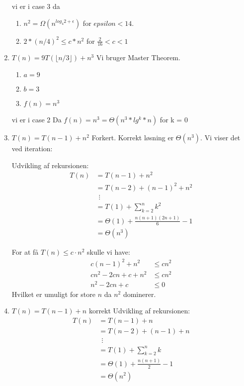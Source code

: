 \documentclass{article}
\theoremstyle{definition}
\begin{document}
\begin{enumerate}
    vi er i case 3 da
    \begin{enumerate}
        \item $n^2 = \Omega(n^{log_4 2+\epsilon})$ for $epsilon < 14$.
        \item $2*(n/4)^2 \leq c*n^2$ for $\frac{2}{16} < c < 1$
    \end{enumerate}


    \item $T(n) = 9T(\lfloor n/3 \rfloor) + n^3$
    Vi bruger Master Theorem.
    \begin{enumerate}
        \item $a=9$
        \item $b=3$
        \item $f(n) = n^3$
    \end{enumerate}
    vi er i case 2 Da
    $f(n)=n^3=\Theta(n^3 * lg^{k}*n)$ for k = 0

    \item $T(n) = T(n-1) + n^2$
    Forkert. Korrekt løsning er $\Theta(n^3)$. 
    Vi viser det ved iteration:
    
    Udvikling af rekursionen:
    \begin{align*}
    T(n) &= T(n-1) + n^2 \\
         &= T(n-2) + (n-1)^2 + n^2 \\
         &\ \ \vdots \\
         &= T(1) + \sum_{k=2}^n k^2 \\
         &= \Theta(1) + \frac{n(n+1)(2n+1)}{6} - 1 \\
         &= \Theta(n^3)
    \end{align*}
    
    For at få $T(n) \leq c\cdot n^2$ skulle vi have:
    \begin{align*}
    c(n-1)^2 + n^2 &\leq cn^2 \\
    cn^2 - 2cn + c + n^2 &\leq cn^2 \\
    n^2 - 2cn + c &\leq 0
    \end{align*}
    Hvilket er umuligt for store $n$ da $n^2$ dominerer.

    \item $T(n) = T(n-1) + n$
    korrekt
    Udvikling af rekursionen:
    \begin{align*}
    T(n) &= T(n-1) + n \\
         &= T(n-2) + (n-1) + n \\
         &\ \ \vdots \\
         &= T(1) + \sum_{k=2}^n k \\
         &= \Theta(1) + \frac{n(n+1)}{2} - 1 \\
         &= \Theta(n^2)
    \end{align*}
\end{enumerate}
\end{document}
